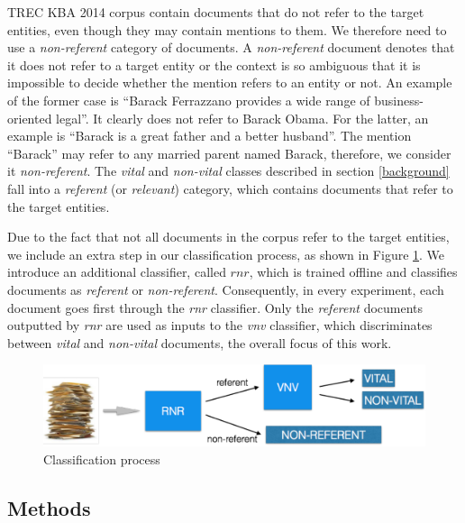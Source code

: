 \documentclass{article}
\begin{document}
TREC KBA 2014 corpus contain documents that do not refer to the target entities, even though they may contain mentions to them. We therefore need to use a \emph{non-referent} category of documents. 
%
A \emph{non-referent} document denotes that it does not refer to a target entity or the context is so ambiguous that it is impossible to decide whether the mention refers to an entity or not. An example of the former case is ``Barack Ferrazzano provides a wide range of business-oriented legal''. It clearly does not refer to Barack Obama. For the latter, an example is ``Barack is a great father and a better husband''. The mention ``Barack'' may refer to any married parent named Barack, therefore, we consider it \emph{non-referent}.
%
The \emph{vital} and \emph{non-vital} classes described in section \ref{background} fall into a \emph{referent} (or \emph{relevant}) category, which contains documents that refer to the target entities.

Due to the fact that not all documents in the corpus refer to the target entities, we include an extra step in our classification process, as shown in Figure \ref{classifier}. We introduce an additional classifier, called $rnr$, which is trained offline and classifies documents as \emph{referent} or \emph{non-referent}.
Consequently, in every experiment, each document goes first through the \emph{rnr} classifier. Only the \emph{referent} documents outputted by \emph{rnr} are used as inputs to the \emph{vnv} classifier, which discriminates between \emph{vital} and \emph{non-vital} documents, the overall focus of this work.

\begin{figure}[tb]
\centering
\includegraphics[width=1\columnwidth]{fig/classifier.pdf}
\caption{Classification process}
\label{classifier}
\end{figure}


\subsection{Methods}
\label{expe}
\end{document}
